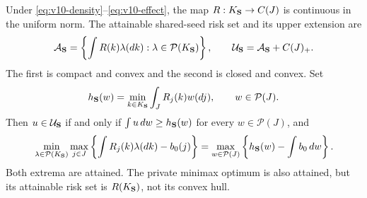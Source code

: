 \begin{theorem}\label{thm:v10-compact}
Under \eqref{eq:v10-density}--\eqref{eq:v10-effect}, the map
$R:K_{\bf S}\to C(J)$ is continuous in the uniform norm. The attainable
shared-seed risk set and its upper extension are
\[
 \mathcal A_{\bf S}=
 \left\{\int R(k)\lambda(dk):\lambda\in\mathcal P(K_{\bf S})\right\},
 \qquad \mathcal U_{\bf S}=\mathcal A_{\bf S}+C(J)_+.
\]
The first is compact and convex and the second is closed and convex.
Set
\[
 h_{\bf S}(w)=\min_{k\in K_{\bf S}}\int_J R_j(k)w(dj),
 \qquad w\in\mathcal P(J).
\]
Then $u\in\mathcal U_{\bf S}$ if and only if
$\int u\,dw\ge h_{\bf S}(w)$ for every $w\in\mathcal P(J)$, and
\begin{equation}\label{eq:v10-duality}
 \min_{\lambda\in\mathcal P(K_{\bf S})}
 \max_{j\in J}\left\{\int R_j(k)\lambda(dk)-b_0(j)\right\}
 =\max_{w\in\mathcal P(J)}
 \left\{h_{\bf S}(w)-\int b_0\,dw\right\}.
\end{equation}
Both extrema are attained. The private minimax optimum is also
attained, but its attainable risk set is $R(K_{\bf S})$, not its
convex hull.
\end{theorem}

